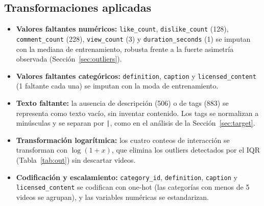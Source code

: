\documentclass[conference]{IEEEtran}
\begin{document}
\subsection{Transformaciones aplicadas}
\begin{itemize}
\item \textbf{Valores faltantes numéricos:} \texttt{like\_count}, \texttt{dislike\_count} (128), \texttt{comment\_count} (228), \texttt{view\_count} (3) y \texttt{duration\_seconds} (1) se imputan con la mediana de entrenamiento, robusta frente a la fuerte asimetría observada (Sección~\ref{sec:outliers}).
\item \textbf{Valores faltantes categóricos:} \texttt{definition}, \texttt{caption} y \texttt{licensed\_content} (1 faltante cada una) se imputan con la moda de entrenamiento.
\item \textbf{Texto faltante:} la ausencia de descripción (506) o de tags (883) se representa como texto vacío, sin inventar contenido. Los tags se normalizan a minúsculas y se separan por \texttt{|}, como en el análisis de la Sección~\ref{sec:target}.
\item \textbf{Transformación logarítmica:} los cuatro conteos de interacción se transforman con $\log(1+x)$, que elimina los outliers detectados por el IQR (Tabla~\ref{tab:out}) sin descartar videos.
\item \textbf{Codificación y escalamiento:} \texttt{category\_id}, \texttt{definition}, \texttt{caption} y \texttt{licensed\_content} se codifican con one-hot (las categorías con menos de 5 videos se agrupan), y las variables numéricas se estandarizan.
\end{itemize}
\end{document}

